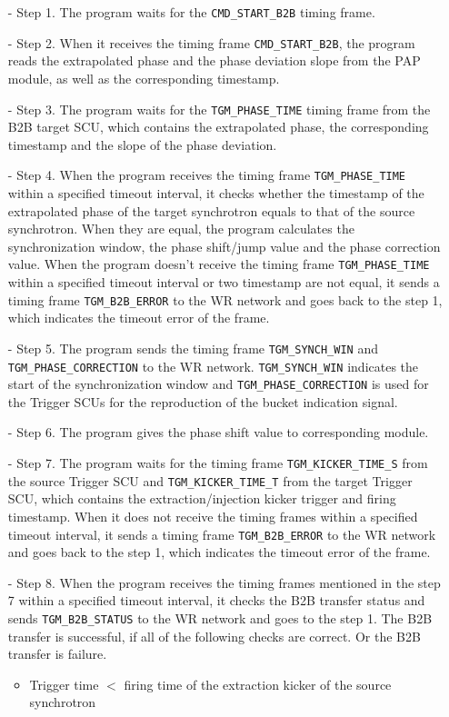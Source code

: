 \begin{itemize}
 	\begin{itemize}
		\item[-]Step 1. The program waits for the \verb|CMD_START_B2B| timing frame.
 		\item[-]Step 2. When it receives the timing frame \verb|CMD_START_B2B|, the program reads the extrapolated phase and the phase deviation slope from the PAP module, as well as the corresponding timestamp.
		\item[-]Step 3. The program waits for the \verb|TGM_PHASE_TIME| timing frame from the B2B target SCU, which contains the extrapolated phase, the corresponding timestamp and the slope of the phase deviation.
		\item[-]Step 4. When the program receives the timing frame \verb|TGM_PHASE_TIME| within a specified timeout interval, it checks whether the timestamp of the extrapolated phase of the target synchrotron equals to that of the source synchrotron. When they are equal, the program calculates the synchronization window, the phase shift/jump value and the phase correction value. When the program doesn't receive the timing frame \verb|TGM_PHASE_TIME| within a specified timeout interval or two timestamp are not equal, it sends a timing frame \verb|TGM_B2B_ERROR| to the WR network and goes back to the step 1, which indicates the timeout error of the frame.  
		\item[-]Step 5. The program sends the timing frame \verb|TGM_SYNCH_WIN| and \verb|TGM_PHASE_CORRECTION| to the WR network. \verb|TGM_SYNCH_WIN| indicates the start of the synchronization window and \verb|TGM_PHASE_CORRECTION| is used for the Trigger SCUs for the reproduction of the bucket indication signal.
		\item[-]Step 6. The program gives the phase shift value to corresponding module.
		\item[-]Step 7. The program waits for the timing frame \verb|TGM_KICKER_TIME_S| from the source Trigger SCU and \verb|TGM_KICKER_TIME_T| from the target Trigger SCU, which contains the extraction/injection kicker trigger and firing timestamp. When it does not receive the timing frames within a specified timeout interval, it sends a timing frame \verb|TGM_B2B_ERROR| to the WR network and goes back to the step 1, which indicates the timeout error of the frame.
		\item[-]Step 8. When the program receives the timing frames mentioned in the step 7 within a specified timeout interval, it checks the B2B transfer status and sends \verb|TGM_B2B_STATUS| to the WR network and goes to the step 1. The B2B transfer is successful, if all of the following checks are correct. Or the B2B transfer is failure. 
\begin{itemize}
	\item Trigger time $<$ firing time of the extraction kicker of the source synchrotron


\end{itemize}
\end{itemize}
\end{itemize}
